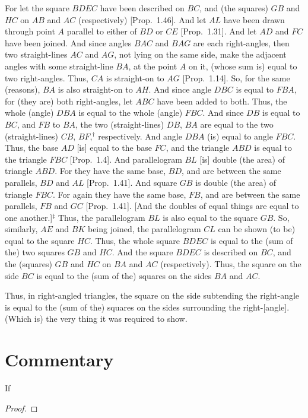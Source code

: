 For let the square $BDEC$ have been described on $BC$, and (the squares) $GB$ and $HC$ on $AB$ and $AC$ (respectively) [Prop.~1.46]. And let $AL$ have been drawn through point $A$ parallel to either of $BD$ or $CE$ [Prop.~1.31]. And let $AD$ and $FC$ have been joined. And
since angles $BAC$ and $BAG$ are each right-angles, then two straight-lines $AC$ and $AG$, not lying on the same side,
make the adjacent angles with some straight-line $BA$, at the point
$A$ on it, (whose sum is) equal to two right-angles. Thus, $CA$ is straight-on to $AG$ [Prop.~1.14]. So, for
the same (reasons), $BA$ is also straight-on to $AH$. And since angle $DBC$ is
equal to $FBA$, for (they are) both right-angles, let $ABC$ have been added to
both.  Thus, the whole (angle) $DBA$ is equal to the whole (angle) $FBC$.
And since $DB$ is equal to $BC$, and $FB$ to $BA$, the two (straight-lines) $DB$,
$BA$ are equal to the two (straight-lines) $CB$, $BF$,$^\dag$ respectively. And angle $DBA$ (is) equal to angle $FBC$. Thus, the base $AD$ [is] equal to the base $FC$,
and the triangle $ABD$ is equal to the triangle $FBC$ [Prop.~1.4]. And 
parallelogram $BL$ [is] double (the area) of triangle $ABD$. For they
have the same base, $BD$, and are between the same parallels, $BD$ and $AL$  [Prop.~1.41]. And
 square
$GB$ is double (the area) of triangle $FBC$. For again they have the same base, $FB$, and
are between the same parallels,
$FB$ and $GC$ [Prop.~1.41]. [And the doubles of equal things
are equal to one another.]$^\ddag$ Thus, the parallelogram $BL$ is also equal to the square $GB$. So, similarly, $AE$ and $BK$ being joined, 
the parallelogram $CL$ can be shown (to be)  equal to the square $HC$. Thus, the whole square
$BDEC$ is equal to the (sum of the) two squares $GB$ and $HC$. And the square $BDEC$
is described on $BC$, and the (squares) $GB$ and $HC$ on $BA$ and $AC$ (respectively). Thus, the square on the side $BC$ is equal to the
(sum of the) squares
on the sides $BA$ and $AC$.

Thus, in right-angled triangles,  the square on the side subtending the right-angle
is equal to the (sum of the) squares on the sides surrounding the right-[angle].
(Which is) the very thing it was required to show.


\section*{Commentary}

\begin{proposition}\label{proposition_47}\leanok
    If
\end{proposition}
\begin{proof}
    \leanok
\end{proof}
